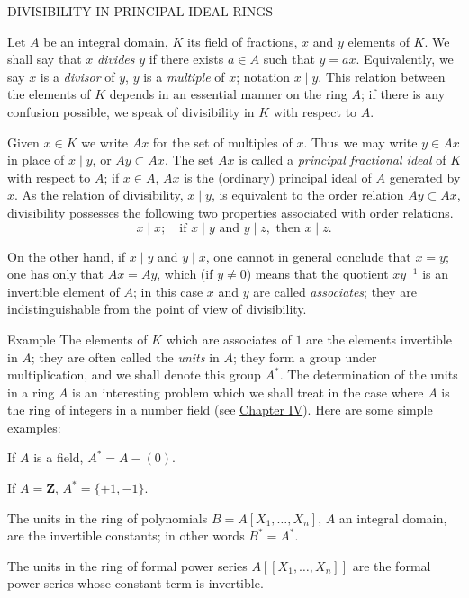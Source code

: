 \clearpage
{}%

%
        {DIVISIBILITY IN PRINCIPAL IDEAL RINGS}

Let $A$ be an integral domain, $K$ its field of fractions, $x$ and $y$
elements of $K$. We shall say that $x$ \emph{divides} $y$ if there exists
$a\in A$ such that $y=ax$. Equivalently, we say $x$ is a \emph{divisor} of
$y$, $y$ is a \emph{multiple} of $x$; notation $x\mid y$. This relation
between the elements of $K$ depends in an essential manner on the ring $A$;
if there is any confusion possible, we speak of divisibility in $K$ with
respect to $A$.

Given $x\in K$ we write $Ax$ for the set of multiples of $x$. Thus we may
write $y\in Ax$ in place of $x\mid y$, or $Ay\subset Ax$. The set $Ax$ is
called a \emph{principal fractional ideal} of $K$ with respect to $A$; if
$x\in A$, $Ax$ is the (ordinary) principal ideal of $A$ generated by $x$. As
the relation of divisibility, $x\mid y$, is equivalent to the order relation
$Ay\subset Ax$, divisibility possesses the following two properties
associated with order relations.
\[
x\mid x;\quad\text{if }x\mid y\text{ and }y\mid z,\text{ then }x\mid z.
\]

On the other hand, if $x\mid y$ and $y\mid x$, one cannot in general conclude
that $x=y$; one has only that $Ax=Ay$, which (if $y\neq0$) means that the
quotient $xy^{-1}$ is an invertible element of $A$; in this case $x$ and $y$
are called \emph{associates}; they are indistinguishable from the point of
view of divisibility.

\begin{statement}{Example}
The elements of $K$ which are associates of $1$ are the elements invertible
in $A$; they are often called the \emph{units} in $A$; they form a group
under multiplication, and we shall denote this group $A^{*}$. The
determination of the units in a ring $A$ is an interesting problem which we
shall treat in the case where $A$ is the ring of integers in a number field
(see \hyperref[chap:IV]{Chapter IV}). Here are some simple examples:
\begin{alist}
\item If $A$ is a field, $A^{*}=A-(0)$.
\item If $A=\mathbf{Z}$, $A^{*}=\{+1,-1\}$.
\item The units in the ring of polynomials $B=A[X_{1},\ldots,X_{n}]$, $A$ an
integral domain, are the invertible constants; in other words $B^{*}=A^{*}$.
\item The units in the ring of formal power series $A[[X_{1},\ldots,X_{n}]]$
are the formal power series whose constant term is invertible.
\end{alist}
\end{statement}


